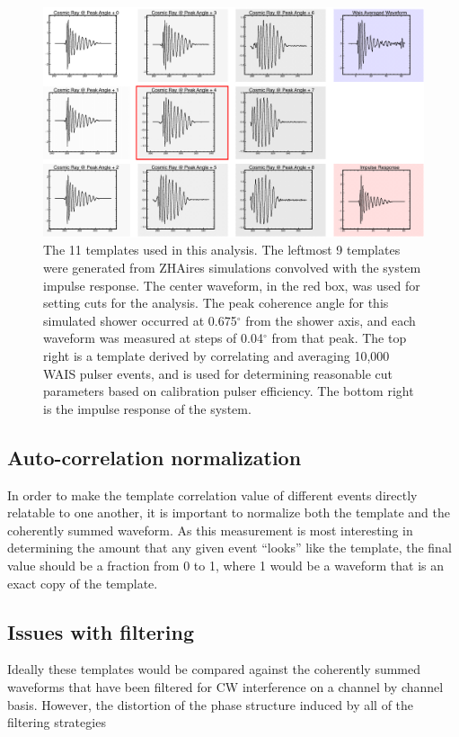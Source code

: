 \begin{figure}
	\centering
	\includegraphics[width=\textwidth]{figures/templates}
	\caption{The 11 templates used in this analysis.  The leftmost 9 templates were generated from ZHAires simulations convolved with the system impulse response. The center waveform, in the red box, was used for setting cuts for the analysis.  The peak coherence angle for this simulated shower occurred at 0.675$^{\circ}$ from the shower axis, and each waveform was measured at steps of 0.04$^{\circ}$ from that peak.  The top right is a template derived by correlating and averaging 10,000 WAIS pulser events, and is used for determining reasonable cut parameters based on calibration pulser efficiency.  The bottom right is the impulse response of the system.} 
	\label{fig:templates}
\end{figure}		
		
		
	
	\subsection{Auto-correlation normalization}
		In order to make the template correlation value of different events directly relatable to one another, it is important to normalize both the template and the coherently summed waveform.  As this measurement is most interesting in determining the amount that any given event ``looks'' like the template, the final value should be a fraction from 0 to 1, where 1 would be a waveform that is an exact copy of the template.

	\subsection{Issues with filtering}
		Ideally these templates would be compared against the coherently summed waveforms that have been filtered for CW interference on a channel by channel basis.  However, the distortion of the phase structure induced by all of the filtering strategies 

